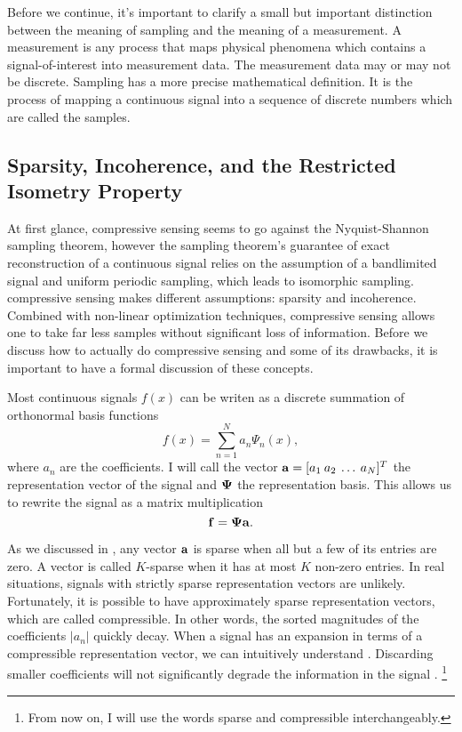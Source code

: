 Before we continue, it's important to clarify a small but important distinction between the meaning of \gls{sampling} and the meaning of a \gls{measurement}. A measurement is any process that maps physical phenomena which contains a signal-of-interest into measurement data. The measurement data may or may not be discrete. Sampling has a more precise mathematical definition. It is the process of mapping a continuous signal into a sequence of discrete numbers which are called the samples. 

\subsection{Sparsity, Incoherence, and the Restricted Isometry Property}

At first glance, \gls{compressive sensing} seems to go against the Nyquist-Shannon sampling theorem, however the sampling theorem's guarantee of exact reconstruction of a continuous signal relies on the assumption of a bandlimited signal and uniform periodic sampling, which leads to isomorphic sampling. \Gls{compressive sensing} makes different assumptions:  \gls{sparsity} and \gls{incoherence}. Combined with non-linear optimization techniques, \gls{compressive sensing} allows one to take far less samples without significant loss of information. Before we discuss how to actually do compressive sensing and some of its drawbacks, it is important to have a formal discussion of these concepts.

Most continuous signals $f(x)$ can be writen as a discrete summation of orthonormal basis functions
\begin{equation}
	f(x) = \sum_{n=1}^{N} a_n \Psi_n(x),
	\label{eq:expansionEquation1}
\end{equation}
where $a_n$ are the coefficients. I will call the vector $\mathbf{a} = [ a_{1} \: a_{2} \: \dots \: a_{N} ]^T$ the representation vector of the signal and $\mathbf{\Psi}$ the representation basis. This allows us to rewrite the signal as a matrix multiplication
\begin{equation}
	\mathbf{f} = \mathbf{\Psi}\mathbf{a}.
\end{equation}

As we discussed in , any vector $\mathbf{a}$ is \gls{sparse} when all but a few of its entries are zero. A vector is called $K$-sparse when it has at most $K$ non-zero entries. In real situations, signals with strictly sparse representation vectors are unlikely. Fortunately, it is possible to have approximately sparse representation vectors, which are called \gls{compressible}. In other words, the sorted magnitudes of the coefficients $|a_n|$ quickly decay. When a signal has an expansion in terms of a compressible representation vector, we can intuitively understand . Discarding smaller coefficients will not significantly degrade the information in the signal \cite{candes2008introduction}. \footnote{From now on, I will use the words \gls{sparse} and \gls{compressible} interchangeably.} 

